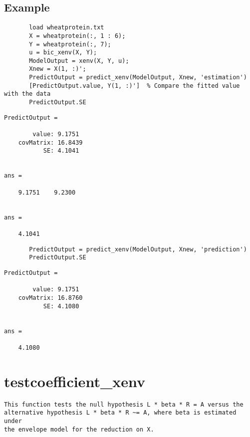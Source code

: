 \documentclass[a4paper,11pt,openany]{memoir}
\begin{document}
\subsection*{Example}


\begin{verbatim}       load wheatprotein.txt
       X = wheatprotein(:, 1 : 6);
       Y = wheatprotein(:, 7);
       u = bic_xenv(X, Y);
       ModelOutput = xenv(X, Y, u);
       Xnew = X(1, :)';
       PredictOutput = predict_xenv(ModelOutput, Xnew, 'estimation')
       [PredictOutput.value, Y(1, :)']  % Compare the fitted value with the data
       PredictOutput.SE\end{verbatim}
        \color{lightgray}\ttfamily \begin{verbatim}
PredictOutput = 

        value: 9.1751
    covMatrix: 16.8439
           SE: 4.1041


ans =

    9.1751    9.2300


ans =

    4.1041
\end{verbatim} \rmfamily
\color{black}
       
       \begin{verbatim}
       PredictOutput = predict_xenv(ModelOutput, Xnew, 'prediction')
       PredictOutput.SE\end{verbatim}

\color{lightgray}\ttfamily \begin{verbatim}
PredictOutput = 

        value: 9.1751
    covMatrix: 16.8760
           SE: 4.1080


ans =

    4.1080

\end{verbatim} \rmfamily
\color{black}

\newpage

\rmfamily
\color{black}\section{testcoefficient\_xenv}


\begin{verbatim}This function tests the null hypothesis L * beta * R = A versus the
alternative hypothesis L * beta * R ~= A, where beta is estimated under
the envelope model for the reduction on X.\end{verbatim}
    
\end{document}
